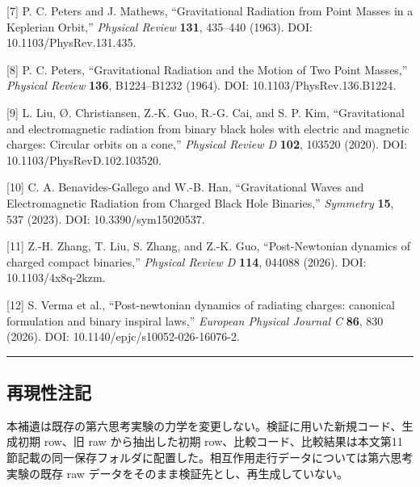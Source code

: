 \documentclass[
  a4paper,
]{ltjsarticle}
\begin{document}
{[}7{]} P. C. Peters and J. Mathews, ``Gravitational Radiation from
Point Masses in a Keplerian Orbit,'' \emph{Physical Review}
\textbf{131}, 435--440 (1963). DOI: 10.1103/PhysRev.131.435.

{[}8{]} P. C. Peters, ``Gravitational Radiation and the Motion of Two
Point Masses,'' \emph{Physical Review} \textbf{136}, B1224--B1232
(1964). DOI: 10.1103/PhysRev.136.B1224.

{[}9{]} L. Liu, Ø. Christiansen, Z.-K. Guo, R.-G. Cai, and S. P. Kim,
``Gravitational and electromagnetic radiation from binary black holes
with electric and magnetic charges: Circular orbits on a cone,''
\emph{Physical Review D} \textbf{102}, 103520 (2020). DOI:
10.1103/PhysRevD.102.103520.

{[}10{]} C. A. Benavides-Gallego and W.-B. Han, ``Gravitational Waves
and Electromagnetic Radiation from Charged Black Hole Binaries,''
\emph{Symmetry} \textbf{15}, 537 (2023). DOI: 10.3390/sym15020537.

{[}11{]} Z.-H. Zhang, T. Liu, S. Zhang, and Z.-K. Guo, ``Post-Newtonian
dynamics of charged compact binaries,'' \emph{Physical Review D}
\textbf{114}, 044088 (2026). DOI: 10.1103/4x8q-2kzm.

{[}12{]} S. Verma et al., ``Post-newtonian dynamics of radiating
charges: canonical formulation and binary inspiral laws,''
\emph{European Physical Journal C} \textbf{86}, 830 (2026). DOI:
10.1140/epjc/s10052-026-16076-2.

\begin{center}\rule{0.5\linewidth}{0.5pt}\end{center}

\subsection{再現性注記}\label{ux518dux73feux6027ux6ce8ux8a18}

本補遺は既存の第六思考実験の力学を変更しない。検証に用いた新規コード、生成初期
row、旧 raw から抽出した初期
row、比較コード、比較結果は本文第11節記載の同一保存フォルダに配置した。相互作用走行データについては第六思考実験の既存
raw データをそのまま検証先とし、再生成していない。
\end{document}
